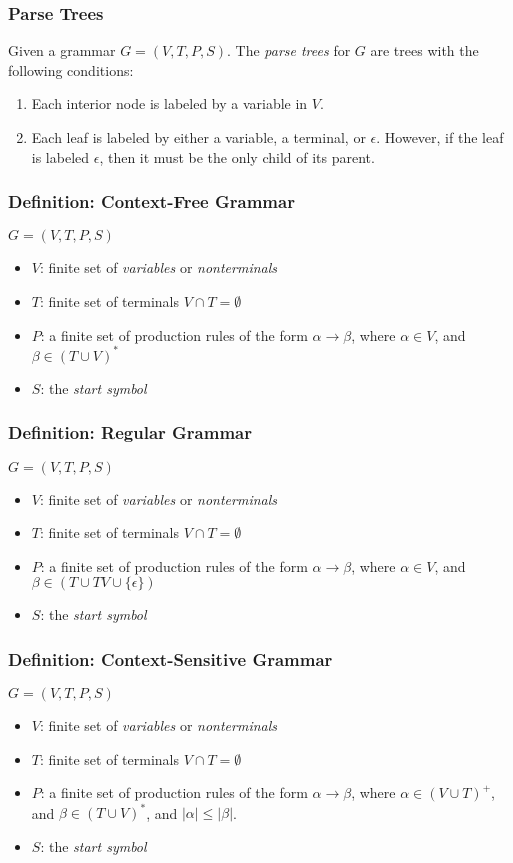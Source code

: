 \documentclass[20pt]{article} %
\begin{document}
\subsubsection{Parse Trees}
Given a grammar $G = (V, T, P, S)$. The \textit{parse trees} for $G$ are trees with the following conditions:
\begin{enumerate}
\item Each interior node is labeled by a variable in $V$.
\item Each leaf is labeled by either a variable, a terminal, or $\epsilon$. However, if the leaf is labeled $\epsilon$, then it must be the only child of its parent.
\end{enumerate}
\subsubsection{Definition: \textbf{Context-Free Grammar}}
$G = (V, T, P, S)$
\begin{itemize}
\item $V$: finite set of \textit{variables} or \textit{nonterminals}
\item $T$: finite set of terminals $V \cap T = \emptyset$
\item $P$: a finite set of production rules of the form $\alpha \rightarrow \beta$, where $\alpha \in V$, and $\beta \in (T \cup V)^{*}$
\item $S$: the \textit{start symbol}
\end{itemize}
\subsubsection{Definition: \textbf{Regular Grammar}}
$G = (V, T, P, S)$
\begin{itemize}
\item $V$: finite set of \textit{variables} or \textit{nonterminals}
\item $T$: finite set of terminals $V \cap T = \emptyset$
\item $P$: a finite set of production rules of the form $\alpha \rightarrow \beta$, where $\alpha \in V$, and $\beta \in (T \cup TV \cup \{ \epsilon \})$
\item $S$: the \textit{start symbol}
\end{itemize}
\subsubsection{Definition: \textbf{Context-Sensitive Grammar}}
$G = (V, T, P, S)$
\begin{itemize}
\item $V$: finite set of \textit{variables} or \textit{nonterminals}
\item $T$: finite set of terminals $V \cap T = \emptyset$
\item $P$: a finite set of production rules of the form $\alpha \rightarrow \beta$, where $\alpha \in (V \cup T)^{+}$, and $\beta \in (T \cup V)^{*}$, and $|\alpha| \leq |\beta|$.
\item $S$: the \textit{start symbol}
\end{itemize}
\end{document}
